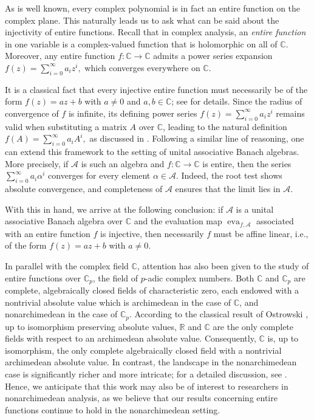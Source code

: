 \documentclass{amsart}
\theoremstyle{definition}
\begin{document}
	
	As is well known, every complex polynomial is in fact an entire function on the complex plane. 
	This naturally leads us to ask what can be said about the injectivity of entire functions. 
	Recall that in complex analysis, an \textit{entire function} in one variable is a complex-valued function 
	that is holomorphic on all of $\mathbb{C}$. 
	Moreover, any entire function $f:\mathbb{C}\to\mathbb{C}$ admits a power series expansion $\displaystyle f(z) = \sum_{i=0}^{\infty} a_i z^i,$
	which converges everywhere on $\mathbb{C}$. 
	
	It is a classical fact that every injective entire function must necessarily be  of the form $f(z) = az + b$ with $a \neq 0$ and $a, b \in \mathbb{C}$; 
	see \cite[Chapter 10, Section 2, Theorem, p.~311]{Bo_Re_91} for details. 
	Since the radius of convergence of $f$ is infinite, its defining power series  $\displaystyle  f(z) = \sum_{i=0}^\infty a_i z^i$
	remains valid when substituting a matrix $A$ over $\mathbb{C}$, leading to the natural definition  
	$\displaystyle  f(A) = \sum_{i=0}^\infty a_i A^i,$
	as discussed in \cite[Theorem 1]{Bo_FrSi_08}. 
	Following a similar line of reasoning, one can extend this framework to the setting of unital associative Banach algebras. 
	More precisely, if $\mathcal{A}$ is such an algebra and $f:\mathbb{C}\to\mathbb{C}$ is entire, 
	then the series $\displaystyle \sum_{i=0}^\infty a_i \alpha^i$ converges for every element $\alpha \in \mathcal{A}$. 
	Indeed, the root test shows absolute convergence, and completeness of $\mathcal{A}$ ensures that the limit lies in $\mathcal{A}$.  
	
	With this in hand, we arrive at the following conclusion: if $\mathcal{A}$ is a unital associative Banach algebra over $\mathbb{C}$ 
	and the evaluation map $\operatorname{eva}_{f,\mathcal{A}}$ associated with an entire function $f$ is injective, 
	then necessarily $f$ must be affine linear, i.e., of the form $f(z) = az + b$ with $a \neq 0$.  
	
	In parallel with the complex field \( \mathbb{C} \), attention has also been given to the study of entire functions over \( \mathbb{C}_p \), the field of \( p \)-adic complex numbers. Both \( \mathbb{C} \) and \( \mathbb{C}_p \) are complete, algebraically closed fields of characteristic zero, each endowed with a nontrivial absolute value which is archimedean in the case of \( \mathbb{C} \), and nonarchimedean in the case of \( \mathbb{C}_p \). According to the classical result of Ostrowski \cite[Theorem 5.5]{Bo_Gri_07}, up to isomorphism preserving absolute values, \( \mathbb{R} \) and \( \mathbb{C} \) are the only complete fields with respect to an archimedean absolute value. Consequently, \( \mathbb{C} \) is, up to isomorphism, the only complete algebraically closed field with a nontrivial archimedean absolute value. In contrast, the landscape in the nonarchimedean case is significantly richer and more intricate; for a detailed discussion, see \cite[Section 9]{Pa_Ba_18}. Hence, we anticipate that this work may also be of interest to researchers in nonarchimedean analysis, as we believe that our results concerning entire functions continue to hold in the nonarchimedean setting. 
	
\end{document}
